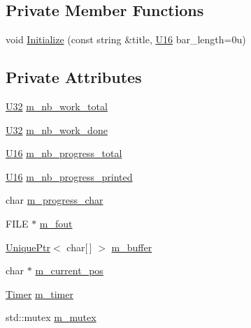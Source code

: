 \subsection*{Private Member Functions}
\begin{DoxyCompactItemize}
\item 
void \hyperlink{classmage_1_1_progress_reporter_a2a243bc9271a1f709674b5a99068e06d}{Initialize} (const string \&title, \hyperlink{namespacemage_af69057eec1ce005c1c3b34ae33486f16}{U16} bar\+\_\+length=0u)
\end{DoxyCompactItemize}
\subsection*{Private Attributes}
\begin{DoxyCompactItemize}
\item 
\hyperlink{namespacemage_a41c104c036fba3756a74e19f793eeaa1}{U32} \hyperlink{classmage_1_1_progress_reporter_a5f3e7dd9faa3d247bd6dd3738aeb7120}{m\+\_\+nb\+\_\+work\+\_\+total}
\item 
\hyperlink{namespacemage_a41c104c036fba3756a74e19f793eeaa1}{U32} \hyperlink{classmage_1_1_progress_reporter_a94bdbb09ae95976c72f1a8387ff96b70}{m\+\_\+nb\+\_\+work\+\_\+done}
\item 
\hyperlink{namespacemage_af69057eec1ce005c1c3b34ae33486f16}{U16} \hyperlink{classmage_1_1_progress_reporter_a09f5810467f9bb1fa4465e6d957748f3}{m\+\_\+nb\+\_\+progress\+\_\+total}
\item 
\hyperlink{namespacemage_af69057eec1ce005c1c3b34ae33486f16}{U16} \hyperlink{classmage_1_1_progress_reporter_ac34bdbf59366144a97780d979cad8167}{m\+\_\+nb\+\_\+progress\+\_\+printed}
\item 
char \hyperlink{classmage_1_1_progress_reporter_a9bb1615723a33f21c8f0b9c5e5549a2d}{m\+\_\+progress\+\_\+char}
\item 
F\+I\+LE $\ast$ \hyperlink{classmage_1_1_progress_reporter_ad325ee5978fd1d16a97acbe37a977982}{m\+\_\+fout}
\item 
\hyperlink{namespacemage_a3316d7143a973e37adf1110f2e80ca31}{Unique\+Ptr}$<$ char\mbox{[}$\,$\mbox{]} $>$ \hyperlink{classmage_1_1_progress_reporter_ad05a4425246e206f867d54939eeb751b}{m\+\_\+buffer}
\item 
char $\ast$ \hyperlink{classmage_1_1_progress_reporter_a7adafaaf90edf29c8c27f4008aea41c9}{m\+\_\+current\+\_\+pos}
\item 
\hyperlink{classmage_1_1_timer}{Timer} \hyperlink{classmage_1_1_progress_reporter_aa3465bfcf344fd9f7f5f32255d90336b}{m\+\_\+timer}
\item 
std\+::mutex \hyperlink{classmage_1_1_progress_reporter_aa6e43cc3c1d56eea9cb3741f05616ac8}{m\+\_\+mutex}
\end{DoxyCompactItemize}


